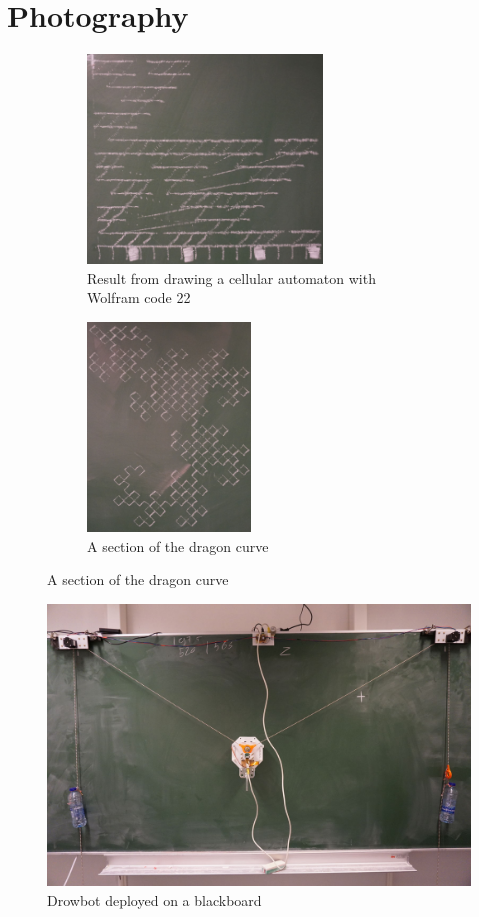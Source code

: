 \documentclass[a4paper,10pt]{article}
\begin{document}
\clearpage
\appendix

\section*{Photography}

\begin{figure}[h!]
  \centering
  \begin{subfigure}[t]{0.55\textwidth}
    \centering
    \includegraphics[height=15em]{img/ca_res.jpg}
    \caption{Result from drawing a cellular automaton with Wolfram code 22}
    \label{fig:ca_res}
  \end{subfigure}
  \begin{subfigure}[t]{0.4\textwidth}
    \centering
    \includegraphics[height=15em]{img/dragon_curve.jpg}
    \caption{A section of the dragon curve}
    \label{fig:drag_curve}
  \end{subfigure}
\end{figure}

\begin{figure}[h!]
  \centering
  \includegraphics{img/overview_rs.jpg}
  \caption{Drowbot deployed on a blackboard}
  \label{fig:overview}
\end{figure}
\end{document}
